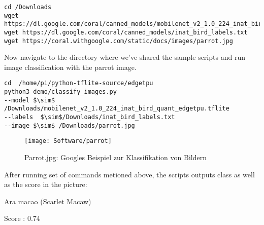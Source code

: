 \begin{verbatim}
cd /Downloads
wget https://dl.google.com/coral/canned_models/mobilenet_v2_1.0_224_inat_bird_quant_edgetpu.tflite
wget https://dl.google.com/coral/canned_models/inat_bird_labels.txt
wget https://coral.withgoogle.com/static/docs/images/parrot.jpg

\end{verbatim}
Now navigate to the directory where we've shared the sample scripts and run image classification with the parrot image.
\begin{verbatim}
cd  /home/pi/python-tflite-source/edgetpu
python3 demo/classify_images.py 
--model $\sim$ /Downloads/mobilenet_v2_1.0_224_inat_bird_quant_edgetpu.tflite
--labels  $\sim$/Downloads/inat_bird_labels.txt 
--image $\sim$ /Downloads/parrot.jpg
\end{verbatim}
\begin{figure}[h]
	\centering
	\texttt{[image: Software/parrot]}
	\caption{Parrot.jpg: Googles Beispiel zur Klassifikation von Bildern
		\cite{GoogleCoral:2019}}
	
\end{figure}
\clearpage 
After running set of commands metioned above, the scripts outputs class as well as the score in the picture:

Ara macao (Scarlet Macaw)

Score :  0.74


